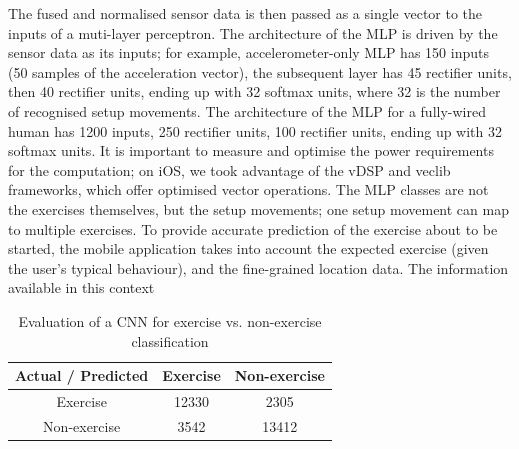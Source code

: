 The fused and normalised sensor data is then passed as a single vector to the inputs of a muti-layer perceptron. The architecture of the MLP is driven by the sensor data as its inputs; for example, accelerometer-only MLP has 150 inputs (50 samples of the acceleration vector), the subsequent layer has 45 rectifier units, then 40 rectifier units, ending up with 32 softmax units, where 32 is the number of recognised setup movements. The architecture of the MLP for a fully-wired human has 1200 inputs, 250 rectifier units, 100 rectifier units, ending up with 32 softmax units. It is important to measure and optimise the power requirements for the computation; on iOS, we took advantage of the vDSP and veclib frameworks, which offer optimised vector operations. The MLP classes are not the exercises themselves, but the setup movements; one setup movement can map to multiple exercises. To provide accurate prediction of the exercise about to be started, the mobile application takes into account the expected exercise (given the user's typical behaviour), and the fine-grained location data. The information available in this context

\begin{table}[h]
\caption{Evaluation of a CNN for exercise vs. non-exercise classification}
\label{exercise}
\begin{center}
\begin{tabular}{|c||c||c|}
\hline
Actual / Predicted & Exercise & Non-exercise\\
\hline
Exercise & 12330 & 2305\\
\hline
Non-exercise & 3542 & 13412\\
\hline
\end{tabular}
\end{center}
\end{table}
